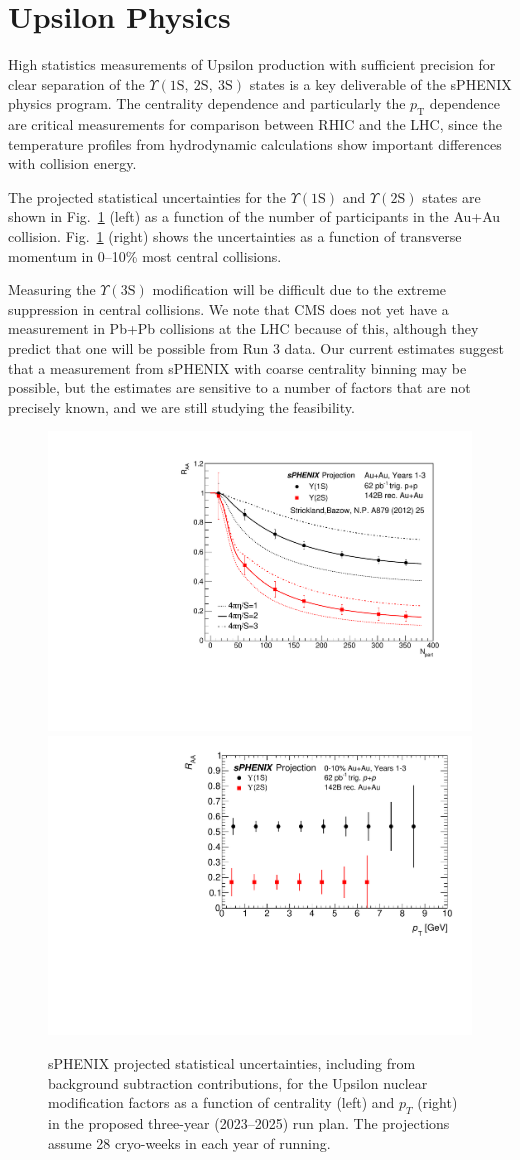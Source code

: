 \section{Upsilon Physics}
\label{sec:upsilon}

High statistics measurements of Upsilon production with sufficient precision for clear separation of the $\Upsilon(1\mathrm{S},\ 2\mathrm{S},\ 3\mathrm{S})$ states is a key deliverable of the sPHENIX physics program. The centrality dependence and particularly the $p_\mathrm{T}$ dependence are critical measurements for comparison between RHIC and the LHC, since the temperature profiles from hydrodynamic calculations show important differences with collision energy.

The projected statistical uncertainties for the $\Upsilon(1\mathrm{S})$ and $\Upsilon(2\mathrm{S})$ states are shown in Fig.~\ref{fig:upsilon3years} (left) as a function of the number of participants in the Au+Au collision. Fig.~\ref{fig:upsilon3years} (right) shows the uncertainties as a function of transverse momentum in 0--10\% most central collisions.

Measuring the $\Upsilon(3\mathrm{S})$ modification will be difficult due to the extreme suppression in central collisions. We note that CMS does not yet have a measurement in Pb+Pb collisions at the LHC because of this, although they predict that one will be possible from Run 3 data. Our current estimates suggest that a measurement from sPHENIX with coarse centrality binning may be possible, but the estimates are sensitive to a number of factors that are not precisely known, and we are still studying the feasibility.

\begin{figure}[h]
    \centering
    \includegraphics[width=0.44\linewidth]{figs/upsilon_centrality_yrs1_3_28wks.pdf}
    \includegraphics[width=0.47\linewidth]{figs/upsilon_RAA_1.pdf}
    \caption{sPHENIX projected statistical uncertainties, including
      from background subtraction contributions, for the Upsilon
      nuclear modification factors as a function of centrality (left) and $p_T$ (right) in the proposed three-year
      (2023--2025) run plan.   The projections assume 28
      cryo-weeks in each year of running. 
      \label{fig:upsilon3years}}
\end{figure}

